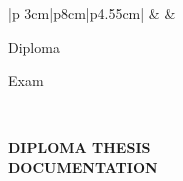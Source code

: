 	\thispagestyle{empty}
	
	\begin {center}
	\begin{tabular} {|p {3cm}|p{8cm}|p{4.55cm}|}
	 \hline 
	\vspace{1mm}
	  &
	 &
		\small{\bfseries{Diploma\par Exam}}\\ 
		\hline
	\end{tabular}
	
	\vspace{5mm}
	\Large{\textbf{DIPLOMA THESIS\\}}
	\vspace{1mm}
	\small{\textbf{DOCUMENTATION\\}}
	\vspace{5mm}  
	

\end{center}
